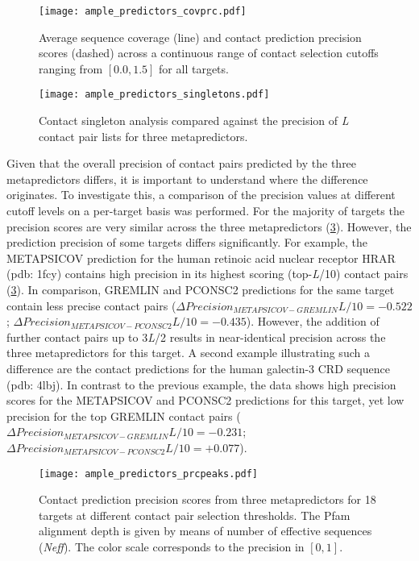 \begin{figure}[H]
    \centering
    \texttt{[image: ample\_predictors\_covprc.pdf]}
    \caption{Average sequence coverage (line) and contact prediction precision scores (dashed) across a continuous range of contact selection cutoffs ranging from $[0.0, 1.5]$ for all targets.}
    \label{fig:ample_predictors_covprc}
\end{figure}

\begin{figure}[H]
    \centering
    \texttt{[image: ample\_predictors\_singletons.pdf]}
    \caption{Contact singleton analysis compared against the precision of \textit{L} contact pair lists for three metapredictors.}
    \label{fig:ample_predictors_singletons}
\end{figure}

Given that the overall precision of contact pairs predicted by the three metapredictors differs, it is important to understand where the difference originates. To investigate this, a comparison of the precision values at different cutoff levels on a per-target basis was performed. For the majority of targets the precision scores are very similar across the three metapredictors (\cref{fig:ample_predictors_prcpeaks}). However, the prediction precision of some targets differs significantly. For example, the METAPSICOV prediction for the human retinoic acid nuclear receptor HRAR (\gls{pdb}: 1fcy) contains high precision in its highest scoring (top-\textit{L}/10) contact pairs (\cref{fig:ample_predictors_prcpeaks}). In comparison, GREMLIN and PCONSC2 predictions for the same target contain less precise contact pairs ($\Delta Precision_{METAPSICOV-GREMLIN} L/10=-0.522$; $\Delta Precision_{METAPSICOV-PCONSC2} L/10=-0.435$). However, the addition of further contact pairs up to 3\textit{L}/2 results in near-identical precision across the three metapredictors for this target. A second example illustrating such a difference are the contact predictions for the human galectin-3 CRD sequence (\gls{pdb}: 4lbj). In contrast to the previous example, the data shows high precision scores for the METAPSICOV and PCONSC2 predictions for this target, yet low precision for the top GREMLIN contact pairs ($\Delta Precision_{METAPSICOV-GREMLIN} L/10=-0.231$; $\Delta Precision_{METAPSICOV-PCONSC2} L/10=+0.077$). 

\begin{figure}[H]
    \centering
    \texttt{[image: ample\_predictors\_prcpeaks.pdf]}
    \caption{Contact prediction precision scores from three metapredictors for 18 targets at different contact pair selection thresholds. The Pfam alignment depth is given by means of number of effective sequences (\textit{Neff}). The color scale corresponds to the precision in $[0, 1]$.}
    \label{fig:ample_predictors_prcpeaks}
\end{figure}

